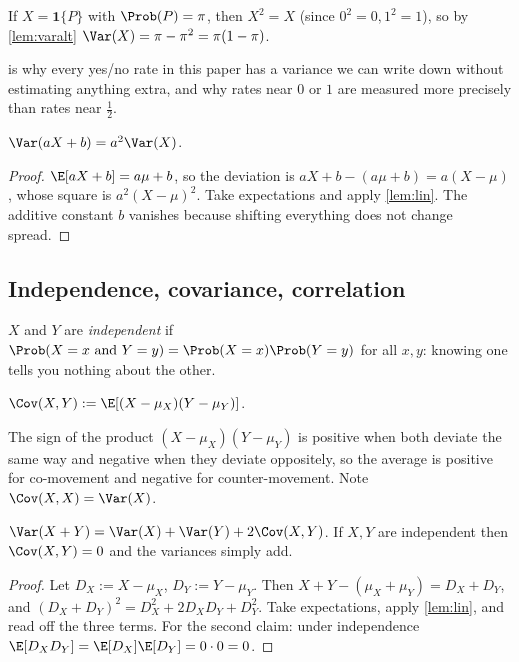 \begin{corollary}
\label{cor:indvar}
If $X = \mathbf{1}\{P\}$ with $\Prob(P) = \pi$, then $X^2 = X$ (since
$0^2=0, 1^2=1$), so by \cref{lem:varalt}
$\Var(X) = \pi - \pi^2 = \pi(1-\pi)$.
\end{corollary}

 is why every yes/no rate in this paper has a variance we can
write down without estimating anything extra, and why rates near $0$ or $1$ are
measured more precisely than rates near $\tfrac12$.

\begin{lemma}[Scaling]
\label{lem:varscale}
$\Var(aX+b) = a^2\Var(X)$.
\end{lemma}
\begin{proof}
$\E[aX+b] = a\mu+b$, so the deviation is $aX+b-(a\mu+b) = a(X-\mu)$, whose square
is $a^2(X-\mu)^2$. Take expectations and apply \cref{lem:lin}. The additive
constant $b$ vanishes because shifting everything does not change spread.
\end{proof}

\subsection{Independence, covariance, correlation}

\begin{definition}[Independence]
$X$ and $Y$ are \emph{independent} if
$\Prob(X=x \text{ and } Y=y) = \Prob(X=x)\Prob(Y=y)$ for all $x,y$: knowing one
tells you nothing about the other.
\end{definition}

\begin{definition}[Covariance]
$\Cov(X,Y) := \E[(X-\mu_X)(Y-\mu_Y)]$.
\end{definition}

The sign of the product $(X-\mu_X)(Y-\mu_Y)$ is positive when both deviate the
same way and negative when they deviate oppositely, so the average is positive
for co-movement and negative for counter-movement. Note $\Cov(X,X)=\Var(X)$.

\begin{lemma}
\label{lem:varsum}
$\Var(X+Y) = \Var(X)+\Var(Y)+2\Cov(X,Y)$. If $X,Y$ are independent then
$\Cov(X,Y)=0$ and the variances simply add.
\end{lemma}
\begin{proof}
Let $D_X := X-\mu_X$, $D_Y := Y-\mu_Y$. Then
$X+Y-(\mu_X+\mu_Y) = D_X+D_Y$, and
$(D_X+D_Y)^2 = D_X^2 + 2D_XD_Y + D_Y^2$. Take expectations, apply
\cref{lem:lin}, and read off the three terms. For the second claim: under
independence $\E[D_XD_Y] = \E[D_X]\E[D_Y] = 0\cdot 0 = 0$.
\end{proof}

